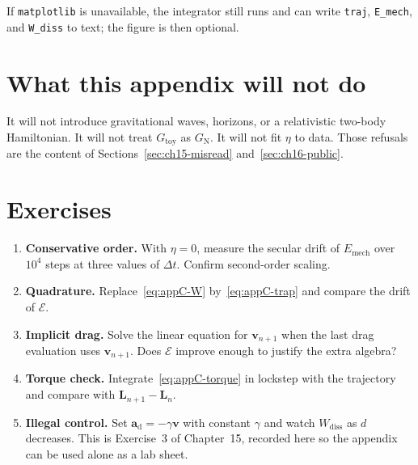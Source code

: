 If \texttt{matplotlib} is unavailable, the integrator still runs
and can write \texttt{traj}, \texttt{E\_mech}, and
\texttt{W\_diss} to text; the figure is then optional.

\section{What this appendix will not do}
\label{sec:appC-not}

It will not introduce gravitational waves, horizons, or a
relativistic two-body Hamiltonian. It will not treat
\(G_{\mathrm{toy}}\) as \(G_{\mathrm{N}}\). It will not fit
\(\eta\) to data. Those refusals are the content of
Sections~\ref{sec:ch15-misread} and~\ref{sec:ch16-public}.

\section{Exercises}
\label{sec:appC-exercises}

\begin{enumerate}
  \item \textbf{Conservative order.}
    With \(\eta=0\), measure the secular drift of
    \(E_{\mathrm{mech}}\) over \(10^{4}\) steps at three values
    of \(\Delta t\). Confirm second-order scaling.
  \item \textbf{Quadrature.}
    Replace~\eqref{eq:appC-W} by~\eqref{eq:appC-trap} and compare
    the drift of \(\mathcal{E}\).
  \item \textbf{Implicit drag.}
    Solve the linear equation for \(\mathbf{v}_{n+1}\) when the
    last drag evaluation uses \(\mathbf{v}_{n+1}\). Does
    \(\mathcal{E}\) improve enough to justify the extra algebra?
  \item \textbf{Torque check.}
    Integrate~\eqref{eq:appC-torque} in lockstep with the
    trajectory and compare with \(\mathbf{L}_{n+1}-\mathbf{L}_n\).
  \item \textbf{Illegal control.}
    Set \(\mathbf{a}_{\mathrm{d}}=-\gamma\mathbf{v}\) with
    constant \(\gamma\) and watch \(W_{\mathrm{diss}}\) as
    \(d\) decreases. This is Exercise~3 of Chapter~15, recorded
    here so the appendix can be used alone as a lab sheet.
\end{enumerate}